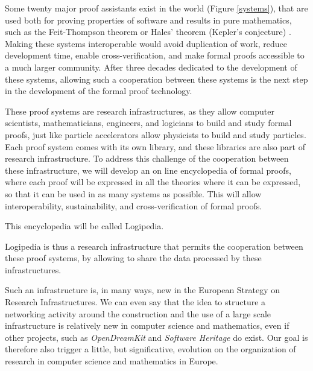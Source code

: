 Some twenty major proof assistants exist in the world (Figure
\ref{systems}), that are used both for proving properties of software
and results in pure mathematics, such as the Feit-Thompson theorem
\cite{Gonthier13} or Hales' theorem (Kepler's conjecture)
\cite{Hales17}.  Making these systems interoperable would avoid
duplication of work, reduce development time, enable
cross-verification, and make formal proofs accessible to a much larger
community.  After three decades dedicated to the development of these
systems, allowing such a cooperation between these systems is the next
step in the development of the formal proof technology.

These proof systems are research infrastructures, as they allow
computer scientists, mathematicians, engineers, and logicians to build
and study formal proofs, just like particle accelerators allow
physicists to build and study particles. Each proof system comes with
its own library, and these libraries are also part of research
infrastructure.  To address this challenge of the cooperation between
these infrastructure, we will develop an on line encyclopedia of
formal proofs, where each proof will be expressed in all the theories
where it can be expressed, so that it can be used in as many systems
as possible. This will allow interoperability, sustainability, and
cross-verification of formal proofs.

This encyclopedia will be called Logipedia.

Logipedia is thus a research infrastructure that permits the
cooperation between these proof systems, by allowing to share the data
processed by these infrastructures.

Such an infrastructure is, in many ways, new in the European Strategy
on Research Infrastructures. We can even say that the idea to
structure a networking activity around the construction and the use
of a large scale infrastructure is relatively new in computer science and
mathematics, even if other projects, such as {\em OpenDreamKit} and
{\em Software Heritage} do exist. Our goal is therefore also trigger a
little, but significative, evolution on the organization of research
in computer science and mathematics in Europe.

